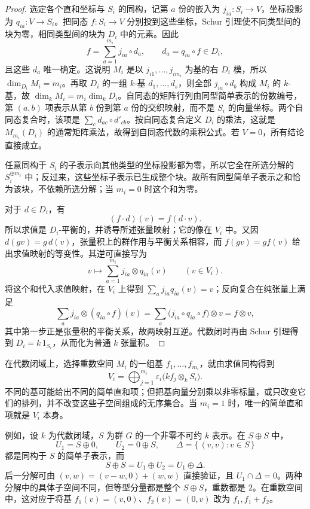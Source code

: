 \begin{proof}
	选定各个直和坐标与 \(S_i\) 的同构，记第 \(a\) 份的嵌入为 \(j_{ia}:S_i\to V\)，坐标投影为 \(q_{ia}:V\to S_i\)。把同态 \(f:S_i\to V\) 分别投到这些坐标，Schur 引理使不同类型间的块为零，相同类型间的块为 \(D_i\) 中的元素。因此
	\[
		f=\sum_{a=1}^{m_i}j_{ia}\circ d_a,\qquad d_a=q_{ia}\circ f\in D_i,
	\]
	且这些 \(d_a\) 唯一确定。这说明 \(M_i\) 是以 \(j_{i1},\ldots,j_{im_i}\) 为基的右 \(D_i\) 模，所以 \(\dim_{D_i}M_i=m_i\)。再取 \(D_i\) 的一组 \(k\)-基 \(d_1,\ldots,d_s\)，则全部 \(j_{ia}\circ d_b\) 构成 \(M_i\) 的 \(k\)-基，故 \(\dim_kM_i=m_i\dim_kD_i\)。自同态的矩阵行列由同型简单表示的份数编号，第 \((a,b)\) 项表示从第 \(b\) 份到第 \(a\) 份的交织映射，而不是 \(S_i\) 的向量坐标。两个自同态复合时，该项是 \(\sum_c d_{ac}\circ d'_{cb}\)。按自同态复合定义 \(D_i\) 的乘法，这就是 \(M_{m_i}(D_i)\) 的通常矩阵乘法，故得到自同态代数的乘积公式。若 \(V=0\)，所有结论直接成立。

	任意同构于 \(S_i\) 的子表示向其他类型的坐标投影都为零，所以它全在所选分解的 \(S_i^{\oplus m_i}\) 中；反过来，这些坐标子表示已生成整个块。故所有同型简单子表示之和恰为该块，不依赖所选分解；当 \(m_i=0\) 时这个和为零。

	对于 \(d\in D_i\)，有
	\[
		(f\cdot d)(v)=f(d\cdot v).
	\]
	所以求值是 \(D_i\)-平衡的，并诱导所述张量映射；它的像在 \(V_i\) 中。又因 \(d(gv)=g\,d(v)\)，张量积上的群作用与平衡关系相容，而 \(f(gv)=gf(v)\) 给出求值映射的等变性。其逆可直接写为
	\[
		v\longmapsto\sum_{a=1}^{m_i}j_{ia}\otimes q_{ia}(v)\qquad(v\in V_i).
	\]
	将这个和代入求值映射，在 \(V_i\) 上得到 \(\sum_a j_{ia}q_{ia}(v)=v\)；反向复合在纯张量上满足
	\[
		\sum_a j_{ia}\otimes(q_{ia}\circ f)(v) =\sum_a\bigl(j_{ia}\circ q_{ia}\circ f\bigr)\otimes v =f\otimes v,
	\]
	其中第一步正是张量积的平衡关系，故两映射互逆。代数闭时再由 Schur 引理得到 \(D_i=k\,1_{S_i}\)，从而化为普通 \(k\) 张量积。
\end{proof}

在代数闭域上，选择重数空间 \(M_i\) 的一组基 \(f_1,\ldots,f_{m_i}\)，就由求值同构得到
\[
	V_i=\bigoplus_{j=1}^{m_i}\varepsilon_i\bigl(kf_j\otimes_k S_i\bigr).
\]
不同的基可能给出不同的简单直和项；但把基向量分别乘以非零标量，或只改变它们的排列，并不改变这些子空间组成的无序集合。当 \(m_i=1\) 时，唯一的简单直和项就是 \(V_i\) 本身。

\ProseParagraphBreak
例如，设 \(k\) 为代数闭域，\(S\) 为群 \(G\) 的一个非零不可约 \(k\) 表示。在 \(S\oplus S\) 中，
\[
	U_1=S\oplus0,\qquad U_2=0\oplus S,\qquad \Delta=\{\,(v,v):v\in S\,\}
\]
都是同构于 \(S\) 的简单子表示，而
\[
	S\oplus S=U_1\oplus U_2=U_1\oplus\Delta.
\]
后一分解可由 \((v,w)=(v-w,0)+(w,w)\) 直接验证，且 \(U_1\cap\Delta=0\)。两种分解中的具体子空间不同，但等型分量都是整个 \(S\oplus S\)，重数都是 \(2\)。在重数空间中，这对应于将基 \(f_1(v)=(v,0)\)、\(f_2(v)=(0,v)\) 改为 \(f_1,f_1+f_2\)。

